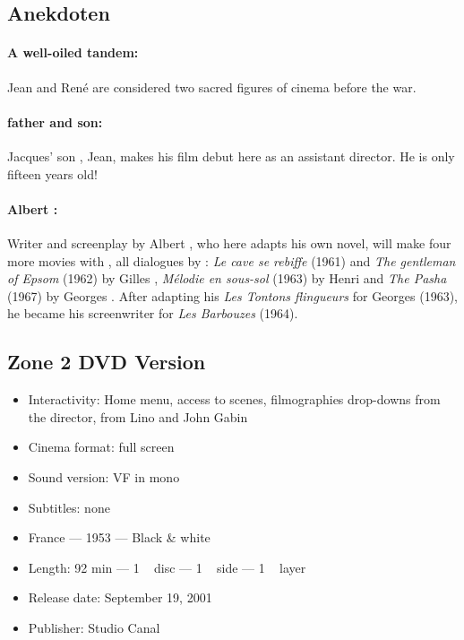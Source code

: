 \subsection*{Anekdoten} 


\paragraph{A well-oiled tandem:} Jean  and René  are considered two sacred figures of cinema before the war.
\paragraph{ father and son:} Jacques' son , Jean, makes his film debut here as an assistant director. He is only fifteen years old!
\paragraph{Albert :} Writer and screenplay by Albert , who here adapts  his own novel, will make four more movies with , all dialogues by : \emph{Le cave se rebiffe} (1961) and \emph{The gentleman of Epsom} (1962) by Gilles , \emph{Mélodie en sous-sol} (1963) by Henri  and \emph{The Pasha} (1967) by Georges . After adapting his \emph{Les Tontons flingueurs} for Georges  (1963), he became his screenwriter for \emph{Les Barbouzes} (1964).

\subsection*{Zone 2 DVD Version}

\begin{itemize}
    \item Interactivity: Home menu, access to scenes, filmographies drop-downs from the director, from Lino  and John \familyname Gabin{}
    \item Cinema format: full screen
    \item Sound version: VF in mono
    \item Subtitles: none
    \item France --- 1953 --- Black \& white
    \item Length: 92 min --- 1 ~ disc --- 1 ~ side --- 1 ~ layer
    \item Release date: September 19, 2001
    \item Publisher: Studio Canal
\end{itemize}

